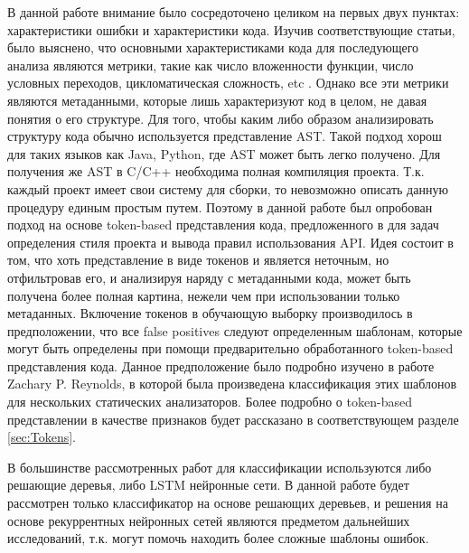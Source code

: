 В данной работе внимание было сосредоточено целиком на первых двух пунктах: характеристики ошибки и характеристики кода. Изучив соответствующие статьи, было выяснено, что основными характеристиками кода для последующего анализа являются метрики, такие как число вложенности функции, число условных переходов, цикломатическая сложность, etc \cite{test-suites-for-dataset}. Однако все эти метрики являются метаданными, которые лишь характеризуют код в целом, не давая понятия о его структуре. Для того, чтобы каким либо образом анализировать структуру кода обычно используется представление AST\cite{Shedko2020ApplyingPM}. Такой подход хорош для таких языков как Java, Python, где AST может быть легко получено. Для получения же AST в C/C++ необходима полная компиляция проекта. Т.к. каждый проект имеет свои систему для сборки, то невозможно описать данную процедуру единым простым путем. Поэтому в данной работе был опробован подход на основе token-based представления кода, предложенного в \cite{Shedko2020ApplyingPM} для задач определения стиля проекта и вывода правил использования API. Идея состоит в том, что хоть представление в виде токенов и является неточным, но отфильтровав его, и анализируя наряду с метаданными кода, может быть получена более полная картина, нежели чем при использовании только метаданных. Включение токенов в обучающую выборку производилось в предположении, что все false positives следуют определенным шаблонам, которые могут быть определены при помощи предварительно обработанного token-based представления кода. Данное предположение было подробно изучено в работе Zachary P. Reynolds\cite{Reynolds}, в которой была произведена классификация этих шаблонов для нескольких статических анализаторов. Более подробно о token-based представлении в качестве признаков будет рассказано в соответствующем разделе \ref{sec:Tokens}.

В большинстве рассмотренных работ для классификации используются либо решающие деревья, либо LSTM нейронные сети\cite{test-suites-for-dataset, assesing-validity-of-sa-warnings-cisco}. В данной работе будет рассмотрен только классификатор на основе решающих деревьев, и решения на основе рекуррентных нейронных сетей являются предметом дальнейших исследований, т.к. могут помочь находить более сложные шаблоны ошибок.

